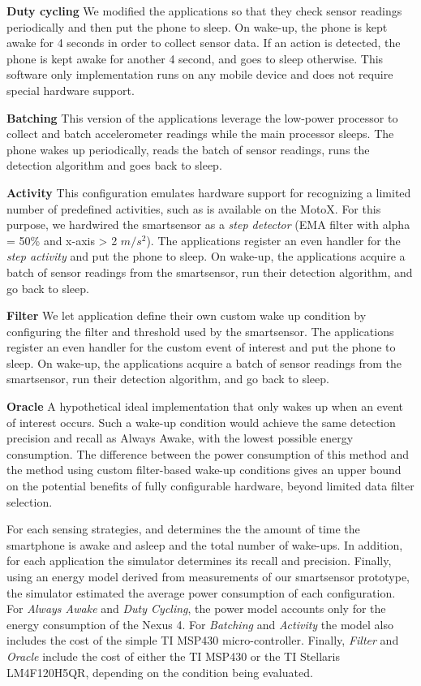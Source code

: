 \textbf{Duty cycling} We modified the applications so that they check
sensor readings periodically and then put the phone to sleep.  On
wake-up, the phone is kept awake for 4 seconds in order to collect
sensor data.  If an action is detected, the phone is kept awake for
another 4 second, and goes to sleep otherwise.  This software only
implementation runs on any mobile device and does not require special
hardware support.

\textbf{Batching} This version of the applications leverage the
low-power processor to collect and batch accelerometer readings while
the main processor sleeps.  The phone wakes up periodically, reads the
batch of sensor readings, runs the detection algorithm and goes back
to sleep.

\textbf{Activity} This configuration emulates hardware support for
recognizing a limited number of predefined activities, such as is
available on the MotoX.  For this purpose, we hardwired the
smartsensor as a {\em step detector} (EMA filter with alpha = 50\% and
x-axis > 2 $m/s^2$).  The  applications register an even handler for
the {\em step activity} and put the phone to sleep.  On wake-up, the
applications acquire a batch of sensor readings from the smartsensor,
run their detection algorithm, and go back to sleep.

\textbf{Filter} We let application define their own custom wake up
condition by configuring the filter and threshold used by the
smartsensor.  The applications register an even handler for the custom
event of interest and put the phone to sleep.  On wake-up, the
applications acquire a batch of sensor readings from the smartsensor,
run their detection algorithm, and go back to sleep.

\textbf{Oracle} A hypothetical ideal implementation that only wakes up
when an event of interest occurs.  Such a wake-up condition would
achieve the same detection precision and recall as Always Awake, with
the lowest possible energy consumption. The difference between the
power consumption of this method and the method using custom
filter-based wake-up conditions gives an upper bound on the potential
benefits of fully configurable hardware, beyond limited data filter
selection.

For each sensing strategies, and determines the the amount of time the
smartphone is awake and asleep and the total number of wake-ups.  In
addition, for each application the simulator determines its recall and
precision.  Finally, using an energy model derived from measurements
of our smartsensor prototype, the simulator estimated the average
power consumption of each configuration.  For {\em Always Awake} and
{\em Duty Cycling}, the power model accounts only for the energy
consumption of the Nexus 4.  For {\em Batching} and {\em Activity} the
model also includes the cost of the simple TI MSP430 micro-controller.
Finally, {\em Filter} and {\em Oracle} include the cost of either the
TI MSP430 or the TI Stellaris LM4F120H5QR, depending on the condition
being evaluated.








